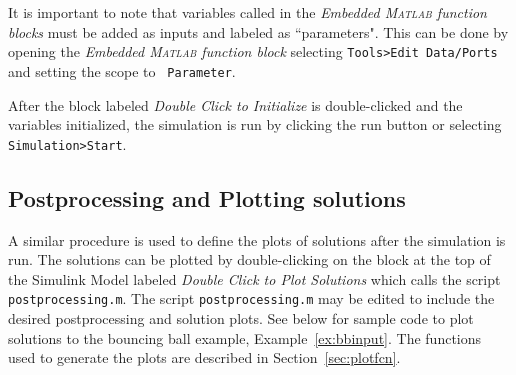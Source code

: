 \documentclass{article}
\newcommand{\matlab}{\textsc{Matlab}}
\begin{document}
% 
\label{scr:initializationBB_inst}

It is important to note that variables called in the 
{\em Embedded \matlab{} function blocks}
must be added as inputs and labeled as ``parameters". 
This can be done by opening the {\em Embedded \matlab{} function block}
selecting {\tt Tools>Edit Data/Ports} and setting the scope to {\tt
Parameter}.

After the block labeled {\em Double Click to Initialize} is double-clicked 
and the variables initialized, the simulation is run by clicking the run button 
or selecting {\tt Simulation>Start}.


\subsection{Postprocessing and Plotting solutions}
\label{sec:postprocessing}

A similar procedure is used to define the plots of solutions after the simulation is run. 
The solutions can be plotted by double-clicking on the block at the top of the Simulink Model 
labeled {\em Double Click to Plot Solutions} which calls the script {\tt postprocessing.m}. 
The script {\tt postprocessing.m} may be edited to include the desired postprocessing and solution plots. 
See below for sample code to plot solutions to the bouncing ball example, Example~\ref{ex:bbinput}. 
The functions used to generate the plots are described in Section~\ref{sec:plotfcn}.\\

% 
\label{scr:postprocesingBB_inst}




% 

% 

% 

% 

% 

% 
\end{document}
